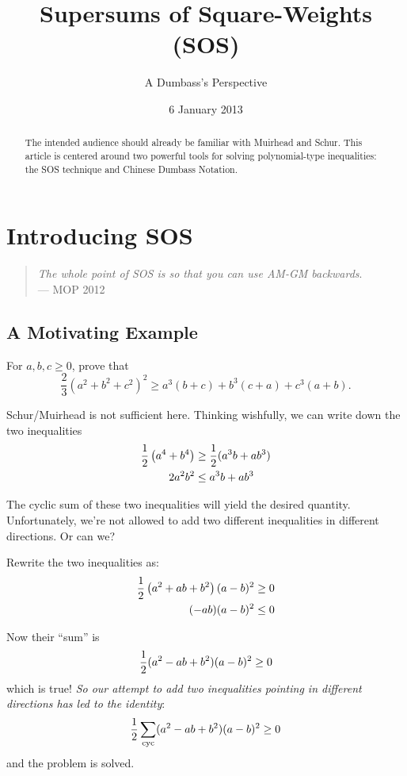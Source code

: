 \documentclass{scrartcl}
\begin{document}
\title{Supersums of Square-Weights (SOS)}
\subtitle{A Dumbass's Perspective}
\date{6 January 2013}
\maketitle

\begin{abstract}
  The intended audience should already be familiar with Muirhead and Schur.
  This article is centered around two powerful tools
  for solving polynomial-type inequalities:
  the SOS technique and Chinese Dumbass Notation.
\end{abstract}

\section{Introducing SOS}
\begin{quote}
  \emph{The whole point of SOS is so that you can use AM-GM backwards}. \\
  --- MOP 2012
\end{quote}

\subsection{A Motivating Example}
\begin{example}
  For $a,b,c \ge 0$, prove that \[ \frac{2}{3}(a^2+b^2+c^2)^2 \ge a^3(b+c) + b^3(c+a) + c^3(a+b). \]
\end{example}
\begin{soln}
  Schur/Muirhead is not sufficient here.
  Thinking wishfully, we can write down the two inequalities
  \begin{align*}
    \frac{1}{2} \left( a^4+b^4 \right) &\ge \frac{1}{2} (a^3b+ab^3) \\
    2a^2b^2 &\le a^3b + ab^3
  \end{align*}

  The cyclic sum of these two inequalities will yield the desired quantity.
  Unfortunately, we're not allowed to add two different inequalities in different directions.
  Or can we?

  Rewrite the two inequalities as:
  \begin{align*}
    \frac{1}{2} \left( a^2+ab+b^2 \right)(a-b)^2 &\ge 0 \\
    (-ab)(a-b)^2 &\le 0 \\
  \end{align*}

  Now their ``sum'' is
  \[ \frac{1}{2} (a^2-ab+b^2)(a-b)^2 \ge 0 \]
  which is true!
  \emph{So our attempt to add two inequalities pointing in different directions
  has led to the identity}:
  \[ \frac{1}{2} \sum_{\text{cyc}} (a^2-ab+b^2)(a-b)^2 \ge 0 \]
  and the problem is solved.
\end{soln}
\end{document}
